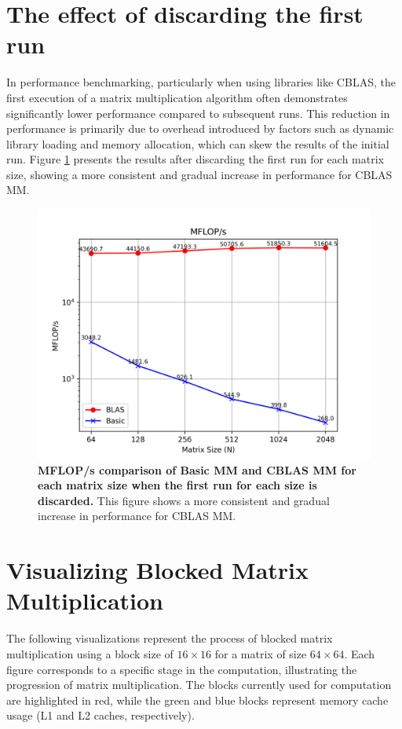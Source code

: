 \appendixpage
\section{The effect of discarding the first run}
\label{sec:effect-of-disregarding-the-first-run}
In performance benchmarking, particularly when using libraries like CBLAS, the first execution of a matrix multiplication algorithm often demonstrates significantly lower performance compared to subsequent runs. This reduction in performance is primarily due to overhead introduced by factors such as dynamic library loading and memory allocation, which can skew the results of the initial run. Figure \ref{fig:mflops-Basic-CBLAS-2nd-run} presents the results after discarding the first run for each matrix size, showing a more consistent and gradual increase in performance for CBLAS MM.


\begin{figure}[htbp]
    \centering
    \includegraphics[width=1.0\linewidth]{images/Basic-MM-and-CBLAS_MFLOPs_2nd-run.png}
    \caption{\textbf{MFLOP/s comparison of Basic MM and CBLAS MM for each matrix size when the first run for each size is discarded.} This figure shows a more consistent and gradual increase in performance for CBLAS MM.}
    \label{fig:mflops-Basic-CBLAS-2nd-run}
\end{figure}

\FloatBarrier
\section{Visualizing Blocked Matrix Multiplication}
\label{sec:visualize-bmmco}
The following visualizations represent the process of blocked matrix multiplication using a block size of \(16 \times 16\) for a matrix of size \(64 \times 64\). Each figure corresponds to a specific stage in the computation, illustrating the progression of matrix multiplication. The blocks currently used for computation are highlighted in red, while the green and blue blocks represent memory cache usage (L1 and L2 caches, respectively).

